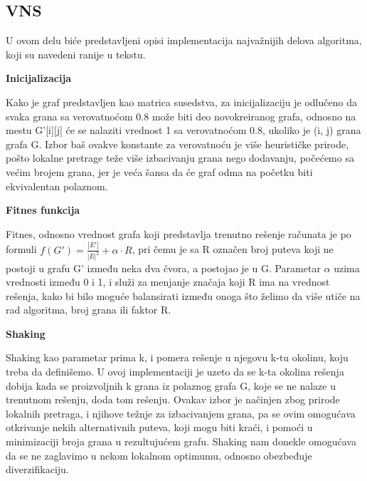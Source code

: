 \documentclass{article}
\begin{document}
\subsection{\huge VNS}\label{sec:vnsi}
U ovom delu biće predstavljeni opisi implementacija najvažnijih delova algoritma, koji su navedeni ranije u tekstu.
\newline
\newline

\textbf{Inicijalizacija}
\newline

Kako je graf predstavljen kao matrica susedstva, za inicijalizaciju je odlučeno da svaka grana sa verovatnoćom 0.8 može biti deo novokreiranog grafa, odnosno na mestu G'[i][j] će se nalaziti vrednost 1 sa verovatnoćom 0.8, ukoliko je (i, j) grana grafa G. Izbor baš ovakve konstante za verovatnoću je više heurističke prirode, pošto lokalne pretrage teže više izbacivanju grana nego dodavanju, počećemo sa većim brojem grana, jer je veća šansa da će graf odma na početku biti ekvivalentan polaznom.
\newline
\newline

\textbf{Fitnes funkcija}
\newline

Fitnes, odnosno vrednost grafa koji predstavlja trenutno rešenje računata je po formuli $f(G') = \frac{|E'|}{|E|^2} + \alpha \cdot R$, pri čemu je sa R označen broj puteva koji ne postoji u grafu G' između neka dva čvora, a postojao je u G. Parametar $\alpha$ uzima vrednosti između 0 i 1, i služi za menjanje značaja koji R ima na vrednost rešenja, kako bi bilo moguće balansirati između onoga što želimo da više utiče na rad algoritma, broj grana ili faktor R.
\newline
\newline

\textbf{Shaking}
\newline

Shaking kao parametar prima k, i pomera rešenje u njegovu k-tu okolinu, koju treba da definišemo. U ovoj implementaciji je uzeto da se k-ta okolina rešenja dobija kada se proizvoljnih k grana iz polaznog grafa G, koje se ne nalaze u trenutnom rešenju, doda tom rešenju. Ovakav izbor je načinjen zbog prirode lokalnih pretraga, i njihove težnje za izbacivanjem grana, pa se ovim omogućava otkrivanje nekih alternativnih puteva, koji mogu biti kraći, i pomoći u minimizaciji broja grana u rezultujućem grafu. Shaking nam donekle omogućava da se ne zaglavimo u nekom lokalnom optimumu, odnosno obezbeđuje diverzifikaciju.
\newline
\newline
\end{document}
